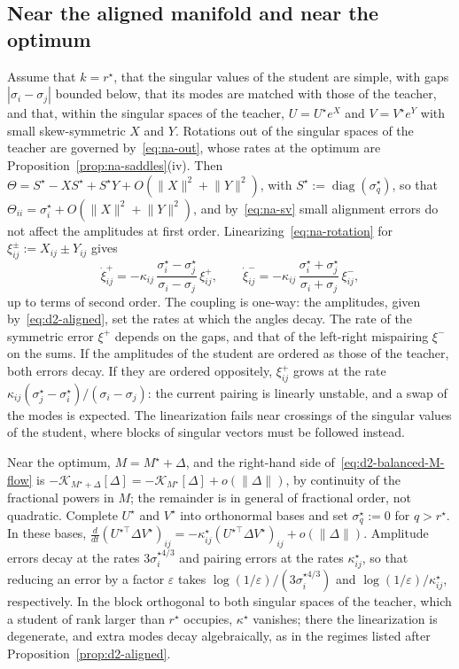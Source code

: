 \documentclass[11pt]{article}
\newcommand{\diag}{\operatorname{diag}}
\newcommand{\norm}[1]{\lVert #1\rVert}
\theoremstyle{definition}
\numberwithin{equation}{section}
\begin{document}
\subsection{Near the aligned manifold and near the optimum}\label{sec:na-near-aligned}

Assume that $k=r^\star$, that the singular values of the student are simple, with gaps $|\sigma_i-\sigma_j|$ bounded below, that its modes are matched with those of the teacher, and that, within the singular spaces of the teacher, $U=U^\star e^X$ and $V=V^\star e^Y$ with small skew-symmetric $X$ and $Y$. Rotations out of the singular spaces of the teacher are governed by~\eqref{eq:na-out}, whose rates at the optimum are Proposition~\ref{prop:na-saddles}(iv). Then $\Theta=S^\star-XS^\star+S^\star Y+O(\norm X^2+\norm Y^2)$, with $S^\star:=\diag(\sigma^\star_q)$, so that $\Theta_{ii}=\sigma^\star_i+O(\norm X^2+\norm Y^2)$, and by~\eqref{eq:na-sv} small alignment errors do not affect the amplitudes at first order. Linearizing~\eqref{eq:na-rotation} for $\xi^\pm_{ij}:=X_{ij}\pm Y_{ij}$ gives
\begin{equation}\label{eq:na-near-aligned}
\dot\xi^+_{ij}=-\kappa_{ij}\,\frac{\sigma^\star_i-\sigma^\star_j}{\sigma_i-\sigma_j}\,\xi^+_{ij},\qquad\dot\xi^-_{ij}=-\kappa_{ij}\,\frac{\sigma^\star_i+\sigma^\star_j}{\sigma_i+\sigma_j}\,\xi^-_{ij},
\end{equation}
up to terms of second order. The coupling is one-way: the amplitudes, given by~\eqref{eq:d2-aligned}, set the rates at which the angles decay. The rate of the symmetric error $\xi^+$ depends on the gaps, and that of the left-right mispairing $\xi^-$ on the sums. If the amplitudes of the student are ordered as those of the teacher, both errors decay. If they are ordered oppositely, $\xi^+_{ij}$ grows at the rate $\kappa_{ij}(\sigma^\star_j-\sigma^\star_i)/(\sigma_i-\sigma_j)$: the current pairing is linearly unstable, and a swap of the modes is expected. The linearization fails near crossings of the singular values of the student, where blocks of singular vectors must be followed instead.

Near the optimum, $M=M^\star+\Delta$, and the right-hand side of~\eqref{eq:d2-balanced-M-flow} is $-\mathcal K_{M^\star+\Delta}[\Delta]=-\mathcal K_{M^\star}[\Delta]+o(\norm\Delta)$, by continuity of the fractional powers in $M$; the remainder is in general of fractional order, not quadratic. Complete $U^\star$ and $V^\star$ into orthonormal bases and set $\sigma^\star_q:=0$ for $q>r^\star$. In these bases, $\tfrac{d}{dt}(U^{\star\top}\Delta V^\star)_{ij}=-\kappa^\star_{ij}(U^{\star\top}\Delta V^\star)_{ij}+o(\norm\Delta)$. Amplitude errors decay at the rates $3\sigma^{\star4/3}_i$ and pairing errors at the rates $\kappa^\star_{ij}$, so that reducing an error by a factor $\varepsilon$ takes $\log(1/\varepsilon)/(3\sigma^{\star4/3}_i)$ and $\log(1/\varepsilon)/\kappa^\star_{ij}$, respectively. In the block orthogonal to both singular spaces of the teacher, which a student of rank larger than $r^\star$ occupies, $\kappa^\star$ vanishes; there the linearization is degenerate, and extra modes decay algebraically, as in the regimes listed after Proposition~\ref{prop:d2-aligned}.
\end{document}
